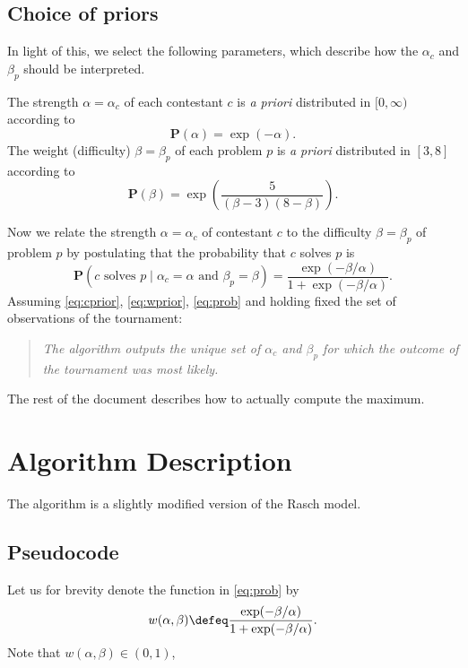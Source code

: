\subsection{Choice of priors}
In light of this, we select the following parameters,
which describe how the $\alpha_c$ and $\beta_p$ should be interpreted.
\begin{itemize}
	\ii The strength $\alpha = \alpha_c$ of each contestant
	$c$ is \emph{a priori} distributed in $[0,\infty)$
	according to
	\begin{equation}
		\mathbf P(\alpha) = \exp(-\alpha).
		\label{eq:cprior}
	\end{equation}
	\ii The weight (difficulty) $\beta = \beta_p$ of each problem $p$ is
	\emph{a priori} distributed in $[3,8]$ according to 
	\begin{equation}
		\mathbf P(\beta) = \exp\left( \frac{5}{(\beta-3)(8-\beta)} \right).
		\label{eq:wprior}
	\end{equation}
\end{itemize}
Now we relate the strength $\alpha = \alpha_c$ of contestant $c$
to the difficulty $\beta = \beta_p$ of problem $p$ by
postulating that the probability that $c$ solves $p$ is
\begin{equation}
	\mathbf P
	\left( \text{$c$ solves $p$} 
	\mid \alpha_c = \alpha \text{ and } \beta_p = \beta \right)
	= \frac{\exp(-\beta/\alpha)}{1 + \exp(-\beta/\alpha)}.
	\label{eq:prob}
\end{equation}
Assuming \eqref{eq:cprior}, \eqref{eq:wprior}, \eqref{eq:prob}
and holding fixed the set of observations of the tournament:
\begin{quote}
\itshape
The algorithm outputs the unique set of $\alpha_c$ and $\beta_p$
for which the outcome of the tournament was most likely.
\end{quote}
The rest of the document describes how to actually compute
the maximum.

\section{Algorithm Description}
The algorithm is a slightly modified version of the Rasch model.

\subsection{Pseudocode}
Let us for brevity denote the function in \eqref{eq:prob} by 
\[ w(\alpha, \beta) \defeq \frac{\exp(-\beta/\alpha)}{1 + \exp(-\beta/\alpha)}. \]
Note that $w(\alpha, \beta) \in (0,1)$,

